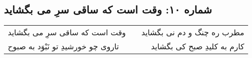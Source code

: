 \begin{center}
\section*{شماره ۱۰: وقت است که ساقی سرِ می بگشاید}
\label{sec:010}
\begin{longtable}{l p{0.5cm} r}
وقت است که ساقی سرِ می بگشاید
&&
مطرب ره چنگ و دم نی بگشاید
\\
تاروی چو خورشیدِ تو نَبْوَد به صبوح
&&
کارم به کلیدِ صبح کی بگشاید
\\
\end{longtable}
\end{center}
